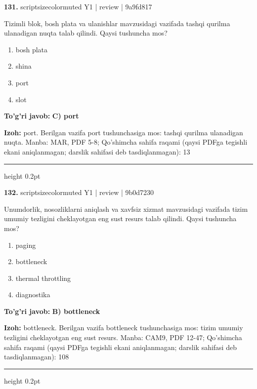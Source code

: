 \documentclass[10pt,a4paper]{article}
\begin{document}
{\bfseries\sffamily\color{ink} 131.} {scriptsizecolor{muted} Y1 | review | 9a9fd817}
\par
Tizimli blok, bosh plata va ulanishlar mavzusidagi vazifada tashqi qurilma ulanadigan nuqta talab qilindi. Qaysi tushuncha mos?
\begin{enumerate}[label=\Alph*),leftmargin=9mm]
\item bosh plata
\item shina
\item port
\item slot
\end{enumerate}
\begin{tcolorbox}[enhanced,breakable,colback=teal!4,colframe=teal!60!black,boxrule=0.45pt,arc=1.2mm,left=2.7mm,right=2.7mm,top=1.8mm,bottom=1.8mm,before skip=2mm,after skip=2mm]
{\bfseries\sffamily\color{teal}To'g'ri javob:} \textbf{C) port}
\par\smallskip
{\bfseries Izoh:} port. Berilgan vazifa port tushunchasiga mos: tashqi qurilma ulanadigan nuqta. Manba: MAR, PDF 5-8; Qo'shimcha sahifa raqami (qaysi PDFga tegishli ekani aniqlanmagan; darslik sahifasi deb tasdiqlanmagan): 13
\end{tcolorbox}
\vspace{2mm}\hrule height 0.2pt\vspace{3mm}

{\bfseries\sffamily\color{ink} 132.} {scriptsizecolor{muted} Y1 | review | 9b0d7230}
\par
Unumdorlik, nosozliklarni aniqlash va xavfsiz xizmat mavzusidagi vazifada tizim umumiy tezligini cheklayotgan eng sust resurs talab qilindi. Qaysi tushuncha mos?
\begin{enumerate}[label=\Alph*),leftmargin=9mm]
\item paging
\item bottleneck
\item thermal throttling
\item diagnostika
\end{enumerate}
\begin{tcolorbox}[enhanced,breakable,colback=teal!4,colframe=teal!60!black,boxrule=0.45pt,arc=1.2mm,left=2.7mm,right=2.7mm,top=1.8mm,bottom=1.8mm,before skip=2mm,after skip=2mm]
{\bfseries\sffamily\color{teal}To'g'ri javob:} \textbf{B) bottleneck}
\par\smallskip
{\bfseries Izoh:} bottleneck. Berilgan vazifa bottleneck tushunchasiga mos: tizim umumiy tezligini cheklayotgan eng sust resurs. Manba: CAM9, PDF 12-47; Qo'shimcha sahifa raqami (qaysi PDFga tegishli ekani aniqlanmagan; darslik sahifasi deb tasdiqlanmagan): 108
\end{tcolorbox}
\vspace{2mm}\hrule height 0.2pt\vspace{3mm}
\end{document}
